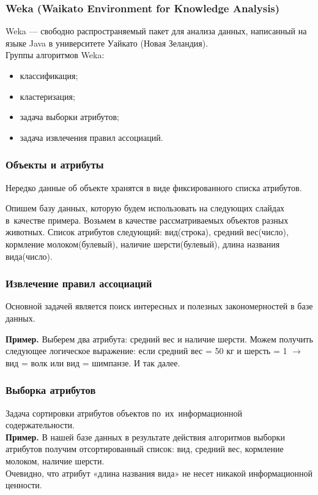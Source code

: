 \documentclass{beamer}
\begin{document}
\begin{frame}
\frametitle{Weka (Waikato Environment for Knowledge Analysis)}

Weka --- свободно распространяемый пакет для анализа данных,
написанный на языке Java в университете Уайкато (Новая Зеландия). \\

Группы алгоритмов Weka:
\begin{itemize}
\item{классификация;}
\item{кластеризация;}
\item{задача выборки атрибутов;}
\item{задача извлечения правил ассоциаций.}
\end{itemize}

\end{frame}

\begin{frame}
\frametitle{Объекты и атрибуты}
Нередко данные  об объекте хранятся в виде фиксированного списка атрибутов.

\vspace{0.5cm}

Опишем базу данных, которую будем использовать на следующих слайдах в~качестве примера.
Возьмем в качестве рассматриваемых объектов разных животных.
Список атрибутов следующий:
вид(строка), средний вес(число), кормление молоком(булевый), наличие шерсти(булевый), длина названия вида(число).
\end{frame}

\begin{frame}
\frametitle{Извлечение правил ассоциаций}

Основной задачей является поиск интересных и полезных закономерностей в базе данных.

{\bf Пример.}
Выберем два атрибута: средний вес и наличие шерсти.
Можем получить следующее логическое выражение: 
если средний вес = 50 кг и шерсть = 1  $\to$ вид = волк или вид = шимпанзе.
И так далее.

\end{frame}

\begin{frame}
\frametitle{Выборка атрибутов}
Задача сортировки атрибутов объектов по~их~информационной содержательности.\\

\vspace{0.5cm}
{\bf Пример.}
В нашей базе данных в результате действия алгоритмов выборки атрибутов получим отсортированный список: вид, средний вес, кормление молоком, наличие шерсти.\\
Очевидно, что атрибут «длина названия вида» не несет никакой информационной ценности.
\end{frame}
\end{document}
